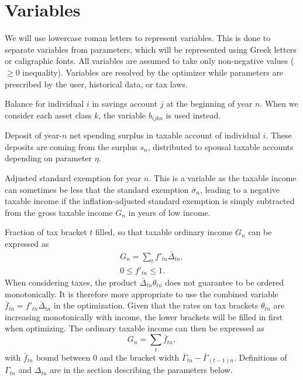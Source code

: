 \documentclass{report}[fleqn,12pt]
\begin{document}
\section{Variables}
We will use lowercase roman letters to represent variables. This is done to separate
variables from parameters, which will be represented using
Greek letters or caligraphic fonts. All variables are assumed
to take only non-negative values ($\ge 0$ inequality). Variables are resolved by the optimizer
while parameters are prescribed by the user, historical data, or tax laws.
\begin{description}[leftmargin=4em,style=multiline]
\item [$b_{ijn}$]
	Balance for individual $i$ in savings account $j$ at the beginning of year $n$.
	When we consider each asset class $k$, the variable $b_{ijkn}$ is used instead.
\item [$d_{in}$]
	Deposit of year-$n$ net spending surplus in taxable account of individual $i$.
	These deposits are coming from the surplus $s_n$, distributed to
	spousal taxable accounts depending on parameter $\eta$.
\item [$e_{n}$]
	Adjusted standard exemption for year $n$. This is a variable as the taxable income can
        sometimes be less that the standard exemption $\bar{\sigma}_n$, leading to a
	negative taxable income if the inflation-adjusted standard exemption is simply subtracted
	from the gross taxable income $G_n$ in years of low income.
\item [$f_{t n}$]
	Fraction of tax bracket $t$ filled, so that taxable ordinary income $G_n$ can be expressed as
	\begin{eqnarray}
		G_n = \sum_t f'_{t n}\bar{\Delta}_{t n},\\
		0 \leq f'_{t n} \leq 1.
	\end{eqnarray}
	When considering taxes,
	the product $\bar{\Delta}_{tn}\theta_{tn}$ does not guarantee to
	be ordered monotonically. It is therefore more appropriate to use the combined variable
	$\bar{f}_{tn} = f'_{tn}\bar{\Delta}_{tn}$ in the optimization. Given that the rates on
	tax brackets $\theta_{tn}$ are increasing monotonically with income, the lower brackets
	will be filled in first when optimizing. The ordinary taxable income can then be expressed as
	\begin{equation}
		\label{Eq:Tx1}
		G_n = \sum_t \bar{f}_{tn},
	\end{equation}
	with $\bar{f}_{tn}$ bound between 0 and the bracket width $\bar{\Gamma}_{tn} - \bar{\Gamma}_{(t-1)n}$. 
	Definitions of $\Gamma_{tn}$ and $\Delta_{tn}$ are in the section describing the parameters below. 


\end{description}
\end{document}
